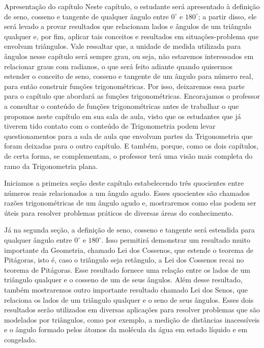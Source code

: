 \begin{apresentacao}{Apresentação do capítulo}
Neste capítulo, o estudante será apresentado à definição de seno, cosseno e tangente de qualquer ângulo entre $0^\circ$ e $180^\circ$; a partir disso, ele será levado a provar resultados que relacionam lados e ângulos de um triângulo qualquer e, por fim, aplicar tais conceitos e resultados em situações-problema que envolvam triângulos.
%
Vale ressaltar que, a unidade de medida utilizada para ângulos nesse capítulo será sempre grau, ou seja,  não estaremos interessados em relacionar graus com radianos, o que será feito adiante quando quisermos estender o conceito de seno, cosseno e tangente de um ângulo para número real, para então construir funções trigonométricas.
%
Por isso, deixaremos essa parte para o capítulo que abordará as funções trigonométricas.
%
Encorajamos o professor a consultar o conteúdo de funções trigonométricas antes de trabalhar o que propomos neste capítulo em sua sala de aula, visto que os estudantes que já tiverem tido contato com o conteúdo de Trigonometria podem levar questionamentos para a sala de aula que envolvam partes da Trigonometria que foram deixadas para o outro capítulo.
%
E também, porque, como os dois capítulos, de certa forma, se complementam, o professor terá uma visão mais completa do ramo da Trigonometria plana.

Iniciamos a primeira seção deste capítulo estabelecendo três quocientes entre números reais relacionados a um ângulo agudo. 
%
Esses quocientes são chamados razões trigonométricas de um ângulo agudo e, mostraremos como elas podem ser úteis para resolver problemas práticos de diversas áreas do conhecimento. 

Já na segunda seção, a definição de seno, cosseno e tangente será estendida para qualquer ângulo entre $0^\circ$ e $180^\circ$. 
%
Isso permitirá demonstrar um resultado muito importante da Geometria, chamado Lei dos Cossenos, que estende o teorema de Pitágoras, isto é, caso o triângulo seja retângulo, a Lei dos Cossenos recai no teorema de Pitágoras.
%
Esse resultado fornece uma relação entre os lados de um triângulo qualquer e o cosseno de um de seus ângulos. 
%
Além desse resultado, também mostraremos outro importante resultado chamado Lei dos Senos, que relaciona os lados de um triângulo qualquer e o seno de seus ângulos.
%
Esses dois resultados serão utilizados em diversas aplicações para resolver problemas que são modelados por triângulos, como por exemplo, a medição de distâncias inacessíveis e o ângulo formado pelos átomos da molécula da água em estado líquido e em congelado.


\end{apresentacao}
